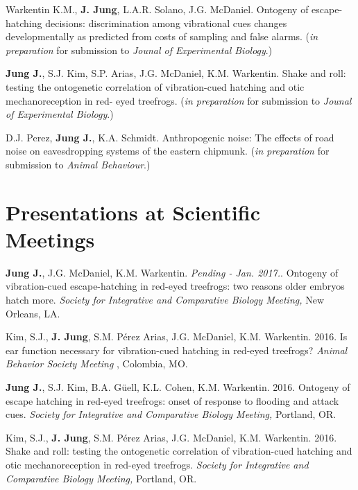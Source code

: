 \documentclass[margin,line]{res}
\begin{document}
\begin{resume}
\vspace{-.3cm}
Warkentin K.M., {\bf J. Jung}, L.A.R. Solano, J.G. McDaniel. {Ontogeny of escape-hatching decisions: discrimination among vibrational cues changes developmentally as predicted from costs of sampling and false alarms.} ({\it in preparation}  for submission to {\it Jounal of Experimental Biology}.) 

\vspace{-.3cm}
{\bf Jung J.}, S.J. Kim, S.P. Arias, J.G. McDaniel, K.M. Warkentin. {Shake and roll: testing the ontogenetic correlation of vibration-cued hatching and otic mechanoreception in red- eyed treefrogs.} ({\it in preparation} for submission to {\it Jounal of Experimental Biology}.)  

\vspace{-.3cm}
D.J. Perez, {\bf Jung J.}, K.A. Schmidt. {Anthropogenic noise: The effects of road noise on eavesdropping systems of the eastern chipmunk.} ({\it in preparation}  for submission to {\it Animal Behaviour}.)  

\section{\sc Presentations at Scientific Meetings}

{\bf Jung J.}, J.G. McDaniel, K.M. Warkentin. {\it Pending - Jan. 2017.}. {Ontogeny of vibration-cued escape-hatching in red-eyed treefrogs: two reasons older embryos hatch more.} {\it Society for Integrative and Comparative Biology Meeting,} {New Orleans, LA.}

\vspace{-.25cm}
Kim, S.J., {\bf J. Jung}, S.M. Pérez Arias, J.G. McDaniel, K.M. Warkentin. {2016.} {Is ear function necessary for vibration-cued hatching in red-eyed treefrogs?} {\it Animal Behavior Society Meeting} {, Colombia, MO.}

\vspace{-.25cm}

{\bf Jung J.}, S.J. Kim, B.A. Güell, K.L. Cohen, K.M. Warkentin. {2016.} {Ontogeny of escape hatching in red-eyed treefrogs: onset of response to flooding and attack cues.} {\it Society for Integrative and Comparative Biology Meeting,} {Portland, OR.}

\vspace{-.25cm}
Kim, S.J., {\bf J. Jung}, S.M. Pérez Arias, J.G. McDaniel, K.M. Warkentin. {2016.} {Shake and roll: testing the ontogenetic correlation of vibration-cued hatching and otic mechanoreception in red-eyed treefrogs.} {\it Society for Integrative and Comparative Biology Meeting,} {Portland, OR.}


\end{resume}
\end{document}
